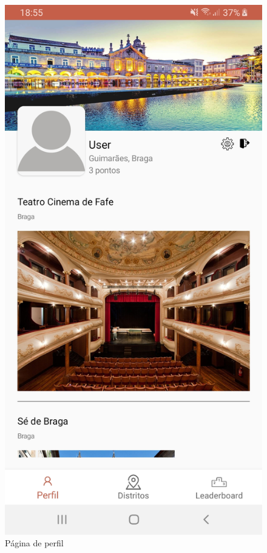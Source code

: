 \begin{figure}[H]
\centering
\includegraphics[width=0.5\linewidth]{images/perfilUtilizador.jpg}
\caption{Página de perfil}
\end{figure}